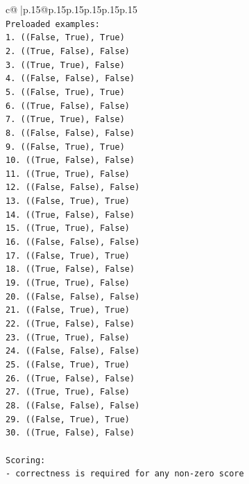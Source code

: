 \documentclass{article}
\begin{document}
{\begin{supertabular}{c@{$\;$}|p{.15\linewidth}@{}p{.15\linewidth}p{.15\linewidth}p{.15\linewidth}p{.15\linewidth}p{.15\linewidth}}
{{{\\ 
\texttt{Preloaded examples:} \\
\texttt{1. ((False, True), True)} \\
\texttt{2. ((True, False), False)} \\
\texttt{3. ((True, True), False)} \\
\texttt{4. ((False, False), False)} \\
\texttt{5. ((False, True), True)} \\
\texttt{6. ((True, False), False)} \\
\texttt{7. ((True, True), False)} \\
\texttt{8. ((False, False), False)} \\
\texttt{9. ((False, True), True)} \\
\texttt{10. ((True, False), False)} \\
\texttt{11. ((True, True), False)} \\
\texttt{12. ((False, False), False)} \\
\texttt{13. ((False, True), True)} \\
\texttt{14. ((True, False), False)} \\
\texttt{15. ((True, True), False)} \\
\texttt{16. ((False, False), False)} \\
\texttt{17. ((False, True), True)} \\
\texttt{18. ((True, False), False)} \\
\texttt{19. ((True, True), False)} \\
\texttt{20. ((False, False), False)} \\
\texttt{21. ((False, True), True)} \\
\texttt{22. ((True, False), False)} \\
\texttt{23. ((True, True), False)} \\
\texttt{24. ((False, False), False)} \\
\texttt{25. ((False, True), True)} \\
\texttt{26. ((True, False), False)} \\
\texttt{27. ((True, True), False)} \\
\texttt{28. ((False, False), False)} \\
\texttt{29. ((False, True), True)} \\
\texttt{30. ((True, False), False)} \\
\\ 
\texttt{Scoring:} \\
\texttt{{-} correctness is required for any non{-}zero score} \\
}}}
\end{supertabular}}
\end{document}

